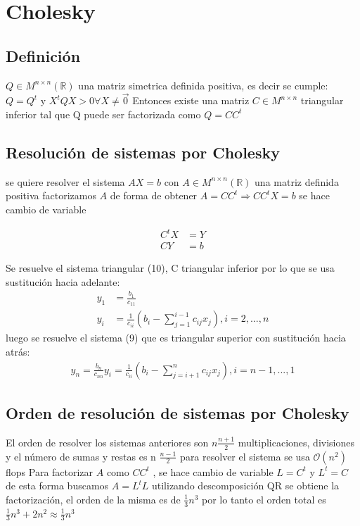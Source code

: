\documentclass{endm}
\begin{document}
\section{Cholesky}
\subsection{Definición}
$Q \in M ^{n\times n} (\mathbb{R})$ una matriz simetrica definida positiva, es decir se cumple:
 $Q=Q^{t}$  y $X^{t}QX > 0 \forall X \neq \vec{0}$
Entonces existe una matriz $C\in M ^{n\times n}$ triangular inferior tal que Q puede ser factorizada como $Q = CC^{t} $
\subsection{Resolución de sistemas por Cholesky}
se quiere resolver el sistema $AX=b$ con $A \in M ^{n\times n} (\mathbb{R})$ una matriz definida positiva
factorizamos $A$ de forma de obtener $A = CC^{t} \Rightarrow CC^{t}X =b$
se hace cambio de variable

\begin{align}
C^{t}X&= Y\\
CY &= b
\end{align}

Se resuelve el sistema triangular (10), C triangular inferior por lo que se usa sustitución hacia adelante:
\begin{align*}
y_{1}&=\frac{b_{1}}{c_{11}}\\
y_{i}&=\frac{1}{c_{ii}}(b_{i}-\sum _{j=1}^{i-1} c_{ij}x_{j}), i=2,...,n
\end{align*}
luego se resuelve el sistema (9) que es triangular superior con sustitución hacia atrás:
\begin{align*}
y_{n}=\frac{b_{n}}{c_{nn}}
y_{i}=\frac{1}{c_{ii}}(b_{i}-\sum _{j=i+1}^{n} c_{ij}x_{j}), i=n-1,...,1
\end{align*}

\subsection{Orden de resolución de sistemas por Cholesky}
El orden de resolver los sistemas anteriores son $n\frac{n+1}{2}$  multiplicaciones, divisiones y el número de sumas  y restas es n $\frac{n-1}{2}$
para resolver el sistema se usa $\mathcal{O}\left(n^{2}\right)$ flops
Para factorizar $A$ como $CC^{t}$ , se hace cambio de variable $L=C^{t}$ y $L^{t}=C$ de esta forma buscamos $A= L^{t}L$   utilizando descomposición QR se obtiene la factorización, el orden de la misma es de $\frac{1}{3}n^{3}$
por lo tanto el orden total es $\frac{1}{3}n^{3} + 2n^{2} \approx \frac{1}{3}n^{3}$
\end{document}
